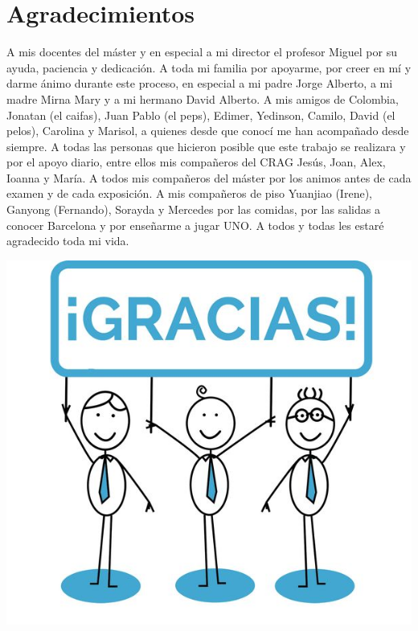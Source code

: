 \documentclass[11pt,spanish,a4paper,oneside,]{book} %
\begin{document}
\endgroup

\clearpage\null\thispagestyle{empty}

\hypertarget{agradecimientos}{%
\chapter*{Agradecimientos}\label{agradecimientos}}


\noindent
A mis docentes del máster y en especial a mi director el profesor Miguel por su ayuda, paciencia y dedicación. A toda mi familia por apoyarme, por creer en mí y darme ánimo durante este proceso, en especial a mi padre Jorge Alberto, a mi madre Mirna Mary y a mi hermano David Alberto. A mis amigos de Colombia, Jonatan (el caifas), Juan Pablo (el peps), Edimer, Yedinson, Camilo, David (el pelos), Carolina y Marisol, a quienes desde que conocí me han acompañado desde siempre. A todas las personas que hicieron posible que este trabajo se realizara y por el apoyo diario, entre ellos mis compañeros del CRAG Jesús, Joan, Alex, Ioanna y María. A todos mis compañeros del máster por los animos antes de cada examen y de cada exposición. A mis compañeros de piso Yuanjiao (Irene), Ganyong (Fernando), Sorayda y Mercedes por las comidas, por las salidas a conocer Barcelona y por enseñarme a jugar UNO. A todos y todas les estaré agradecido toda mi vida.

\begin{flushright}\includegraphics[width=0.1\linewidth]{figures/uvalogo_regular_p_en} \end{flushright}

\backmatter
\end{document}

